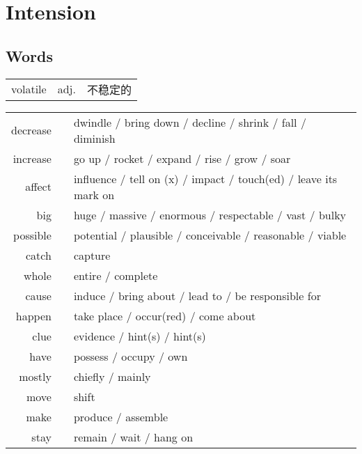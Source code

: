 \section{Intension}

\subsection{Words}

\begin{tabular}{lll}
    volatile & adj. & 不稳定的 \\
\end{tabular}

\begin{tabular}{rc@{\quad$\to$\quad}l}
    decrease &  & dwindle / bring down / decline / shrink / fall / diminish        \\
    increase &  & go up / rocket / expand / rise / grow / soar                     \\
    affect   &  & influence / tell on (x) / impact / touch(ed) / leave its mark on \\
    big      &  & huge / massive / enormous / respectable / vast / bulky           \\
    possible &  & potential / plausible / conceivable / reasonable / viable        \\
    catch    &  & capture                                                          \\
    whole    &  & entire / complete                                                \\
    cause    &  & induce / bring about / lead to / be responsible for              \\
    happen   &  & take place / occur(red) / come about                             \\
    clue     &  & evidence / hint(s) / hint(s)                                     \\
    have     &  & possess / occupy / own                                           \\
    mostly   &  & chiefly / mainly                                                 \\
    move     &  & shift                                                            \\
    make     &  & produce / assemble                                               \\
    stay     &  & remain / wait / hang on                                          \\

\end{tabular}
